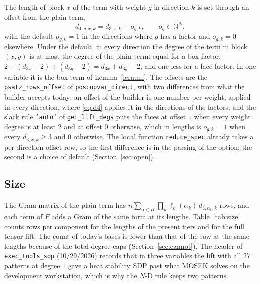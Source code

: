 \documentclass[12pt]{article}
\newcommand{\N}{\mathbb{N}}
\newcommand{\code}[1]{\texttt{#1}}
\theoremstyle{plain}
\theoremstyle{definition}
\theoremstyle{remark}
\begin{document}
The length of block $x$ of the term with weight $g$ in direction $k$ is set through an offset from the plain term,
\begin{equation}\label{eq:d4}
d_{4,g,x,k}=d_{3,x,k}-o_{g,k},\qquad o_g\in\N^N,
\end{equation}
with the default $o_{g,k}=1$ in the directions where $g$ has a factor and $o_{g,k}=0$ elsewhere. Under the default, in every direction the degree of the term in block $(x,y)$ is at most the degree of the plain term: equal for a box factor, $2+(d_{3x}-2)+(d_{3y}-2)=d_{3x}+d_{3y}-2$, and one less for a face factor. In one variable it is the box term of Lemma~\ref{lem:ml}. The offsets are the \code{psatz\_rows\_offset} of \code{poscopvar\_direct}, with two differences from what the builder accepts today: an offset of the builder is one number per weight, applied in every direction, where \eqref{eq:d4} applies it in the directions of the factors; and the slack rule \code{'auto'} of \code{get\_lift\_degs} puts the faces at offset $1$ when every weight degree is at least $2$ and at offset $0$ otherwise, which in lengths is $o_{g,k}=1$ when every $d_{3,x,k}\ge3$ and $0$ otherwise. The local function \code{reduce\_spec} already takes a per-direction offset row, so the first difference is in the parsing of the option; the second is a choice of default (Section~\ref{sec:open}).

\subsection{Size}

The Gram matrix of the plain term has $n\sum_{\alpha\in\Pi}\prod_k\ell_k(\alpha_k)\,d_{3,\alpha_k,k}$ rows, and each term of $F$ adds a Gram of the same form at its lengths. Table~\ref{tab:size} counts rows per component for the lengths of the present tiers and for the full tensor lift. The count of today's bases is lower than that of the row at the same lengths because of the total-degree caps (Section~\ref{sec:cannot}). The header of \code{exec\_tools\_sop} (10/29/2026) records that in three variables the lift with all $27$ patterns at degree $1$ gave a heat stability SDP past what MOSEK solves on the development workstation, which is why the $N$-D rule keeps two patterns.
\end{document}
